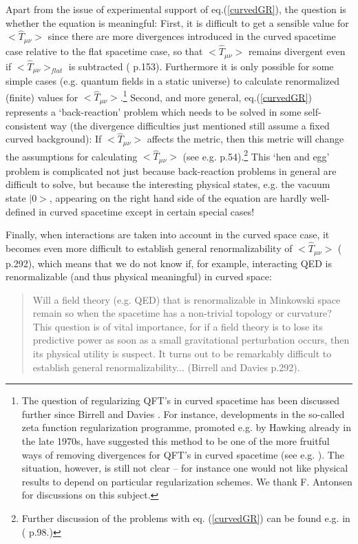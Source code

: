 \documentclass[12pt]{article}
\begin{document}
Apart from the issue of experimental support of
eq.(\ref{curvedGR}), the question is whether the equation is
meaningful: First, it is difficult to get a sensible value for
$<\hat{T}_{\mu \nu}>$ since there are more divergences introduced
in the curved spacetime case relative to the flat spacetime case,
so that $<\hat{T}_{\mu \nu}>$ remains divergent even if
$<\hat{T}_{\mu \nu}>_{flat}$ is subtracted (\cite{birrell82}
p.153). Furthermore it is only possible for some simple cases
(e.g. quantum fields in a static universe) to calculate
renormalized (finite) values for $<\hat{T}_{\mu
\nu}>$.\footnote{The question of regularizing QFT's in curved
spacetime has been discussed further since Birrell and Davies
\cite{birrell82}. For instance, developments in the so-called zeta
function regularization programme, promoted e.g. by Hawking
already in the late 1970s, have suggested this method to be one of
the more fruitful ways of removing divergences for QFT's in curved
spacetime (see e.g. \cite{elizalde95}). The situation, however, is
still not clear -- for instance one would not like physical
results to depend on particular regularization schemes. We thank
F. Antonsen for discussions on this subject.} Second, and more
general, eq.(\ref{curvedGR}) represents a `back-reaction' problem
which needs to be solved in some self-consistent way (the
divergence difficulties just mentioned still assume a fixed curved
background): If $<\hat{T}_{\mu \nu}>$ affects the metric, then
this metric will change the assumptions for calculating
$<\hat{T}_{\mu \nu}>$ (see e.g. \cite{wald94}
p.54).\footnote{Further discussion of the problems with eq.
(\ref{curvedGR}) can be found e.g. in (\cite{wald94} p.98.)} This
`hen and egg' problem is complicated not just because
back-reaction problems in general are difficult to
solve, but because the 
interesting physical states, e.g. the vacuum state $|0>$, 
appearing on the right hand side of the equation are hardly 
well-defined in curved spacetime except in certain special cases!


Finally, when interactions are taken into account in the curved
space case, it becomes even more difficult to establish general
renormalizability of $<\hat{T}_{\mu \nu}>$ (\cite{birrell82}
p.292), which means that we do not know if, for example,
interacting QED is renormalizable (and thus physical meaningful)
in curved space:

\begin{quote}
Will a field theory (e.g. QED) that is renormalizable in 
Minkowski space remain so when the spacetime has a non-trivial
topology or curvature? This question is of vital importance,
for if a field theory is to lose its predictive power as soon
as a small gravitational perturbation occurs, then its physical
utility is suspect. It turns out to be remarkably difficult
to establish general renormalizability... (Birrell and Davies 
\cite{birrell82} p.292).
\end{quote}
\end{document}

